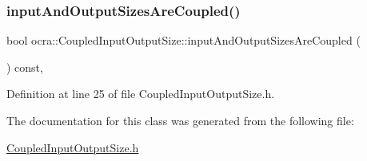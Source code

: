 \subsubsection{\texorpdfstring{input\+And\+Output\+Sizes\+Are\+Coupled()}{inputAndOutputSizesAreCoupled()}}
{\footnotesize\ttfamily bool ocra\+::\+Coupled\+Input\+Output\+Size\+::input\+And\+Output\+Sizes\+Are\+Coupled (\begin{DoxyParamCaption}{ }\end{DoxyParamCaption}) const\hspace{0.3cm}{\ttfamily [inline]}, {\ttfamily [protected]}}



Definition at line 25 of file Coupled\+Input\+Output\+Size.\+h.



The documentation for this class was generated from the following file\+:\begin{DoxyCompactItemize}
\item 
\hyperlink{CoupledInputOutputSize_8h}{Coupled\+Input\+Output\+Size.\+h}\end{DoxyCompactItemize}
